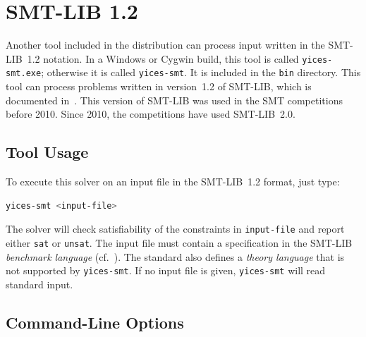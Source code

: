 \documentclass[11pt,twoside,fleqn,openright,titlepage]{cslreport}
\begin{document}
\section{SMT-LIB 1.2}

Another tool included in the distribution can process input written in
the SMT-LIB~1.2 notation. In a Windows or Cygwin build, this tool is called
\texttt{yices-smt.exe}; otherwise it is called \texttt{yices-smt}. It is
included in the \texttt{bin} directory. This tool can process problems
written in version~1.2 of SMT-LIB, which is documented
in~\cite{SMTLIB12:2006}. This version of SMT-LIB was used in the SMT
competitions before 2010.  Since 2010, the competitions have used
SMT-LIB~2.0.


\subsection{Tool Usage}

To execute this solver on an input file in the SMT-LIB~1.2 format, just type:
\begin{small}
\begin{lstlisting}[language=sh]
   yices-smt <input-file>
\end{lstlisting}
\end{small}
The solver will check satisfiability of the constraints in
\texttt{input-file} and report either \texttt{sat} or
\texttt{unsat}. The input file must contain a specification in the
SMT-LIB {\em benchmark language\/} (cf.~\cite{SMTLIB12:2006}). The
standard also defines a {\em theory language\/} that is not supported
by \texttt{yices-smt}. If no input file is given, \texttt{yices-smt}
will read standard input.


\subsection{Command-Line Options}
\end{document}
